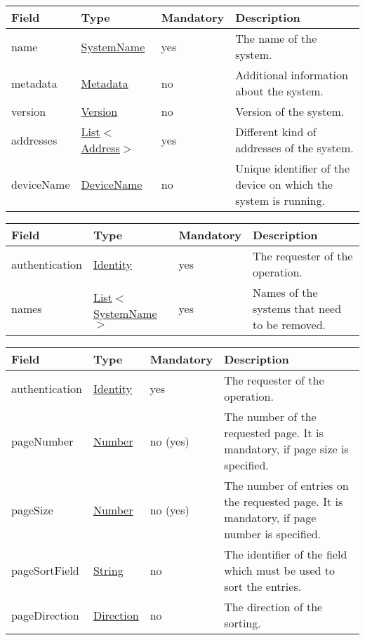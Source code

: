 \documentclass[a4paper]{arrowhead}
\newcommand{\pref}[1]{{\textcolor{ArrowheadGrey}{\hyperref[sec:model:primitives:#1]{#1}}}}
\begin{document}
\begin{table}[ht!]
\begin{tabularx}{\textwidth}{| p{2.5cm} | p{2.5cm} | p{2cm} | X |} \hline
\rowcolor{gray!33} Field & Type & Mandatory & Description \\ \hline
name & \pref{SystemName} & yes & The name of the system. \\ \hline
metadata &\hyperref[sec:model:Metadata]{Metadata} & no & Additional information about the system. \\ \hline
version &\pref{Version} & no & Version of the system. \\ \hline
addresses &  \pref{List}$<$\pref{Address}$>$ & yes & Different kind of addresses of the system.  \\ \hline
deviceName & \pref{DeviceName} & no & Unique identifier of the device on which the system is running. \\ \hline
\end{tabularx}
\end{table}


\begin{table}[H]
\begin{tabularx}{\textwidth}{| p{2.5cm} | p{3.5cm} | p{2cm} | X |} \hline
\rowcolor{gray!33} Field & Type & Mandatory & Description \\ \hline
authentication & \hyperref[sec:model:Identity]{Identity} & yes & The requester of the operation. \\ \hline
names &  \pref{List}$<$\pref{SystemName}$>$ & yes & Names of the systems that need to be removed. \\ \hline
\end{tabularx}
\end{table}


\begin{table}[ht!]
\begin{tabularx}{\textwidth}{| p{2.5cm} | p{2.5cm} | p{2cm} | X |} \hline
\rowcolor{gray!33} Field & Type & Mandatory & Description \\ \hline
authentication & \hyperref[sec:model:Identity]{Identity} & yes & The requester of the operation. \\ \hline
pageNumber & \pref{Number} & no (yes) & The number of the requested page. It is mandatory, if page size is specified. \\ \hline
pageSize & \pref{Number} & no (yes) & The number of entries on the requested page. It is mandatory, if page number is specified. \\ \hline
pageSortField & \pref{String} & no & The identifier of the field which must be used to sort the entries. \\ \hline
pageDirection & \pref{Direction} & no & The direction of the sorting. \\ \hline
\end{tabularx}
\end{table}
\end{document}
